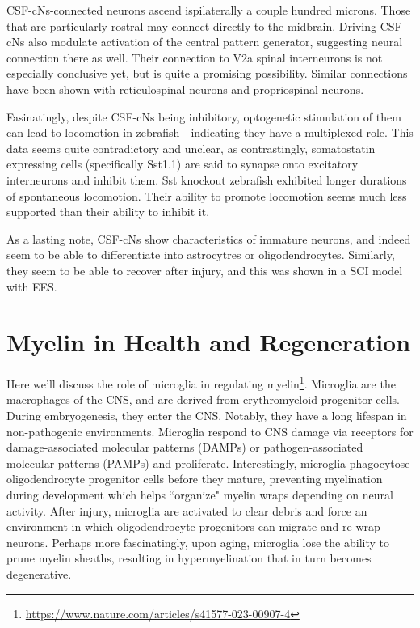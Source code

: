 \documentclass[12pt]{report}
\begin{document}
CSF-cNs-connected neurons ascend ispilaterally a couple hundred microns. Those that are particularly rostral may connect directly to the midbrain. Driving CSF-cNs also modulate activation of the central pattern generator, suggesting neural connection there as well. Their connection to V2a spinal interneurons is not especially conclusive yet, but is quite a promising possibility. Similar connections have been shown with reticulospinal neurons and propriospinal neurons.\newline

Fasinatingly, despite CSF-cNs being inhibitory, optogenetic stimulation of them can lead to locomotion in zebrafish---indicating they have a multiplexed role. This data seems quite contradictory and unclear, as contrastingly, somatostatin expressing cells (specifically Sst1.1) are said to synapse onto excitatory interneurons and inhibit them. Sst knockout zebrafish exhibited longer durations of spontaneous locomotion. Their ability to promote locomotion seems much less supported than their ability to inhibit it.\newline

As a lasting note, CSF-cNs show characteristics of immature neurons, and indeed seem to be able to differentiate into astrocytres or oligodendrocytes. Similarly, they seem to be able to recover after injury, and this was shown in a SCI model with EES. 


\section{Myelin in Health and Regeneration}


Here we'll discuss the role of microglia in regulating myelin\footnote{\url{https://www.nature.com/articles/s41577-023-00907-4}}. Microglia are the macrophages of the CNS, and are derived from erythromyeloid progenitor cells. During embryogenesis, they enter the CNS. Notably, they have a long lifespan in non-pathogenic environments. Microglia respond to CNS damage via receptors for damage-associated molecular patterns (DAMPs) or pathogen-associated molecular patterns (PAMPs) and proliferate. Interestingly, microglia phagocytose oligodendrocyte progenitor cells before they mature, preventing myelination during development which helps ``organize" myelin wraps depending on neural activity. After injury, microglia are activated to clear debris and force an environment in which oligodendrocyte progenitors can migrate and re-wrap neurons. Perhaps more fascinatingly, upon aging, microglia lose the ability to prune myelin sheaths, resulting in hypermyelination that in turn becomes degenerative.\newline
\end{document}
